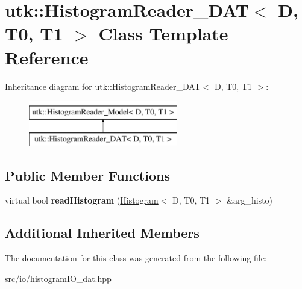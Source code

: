 \hypertarget{classutk_1_1HistogramReader__DAT}{\section{utk\-:\-:Histogram\-Reader\-\_\-\-D\-A\-T$<$ D, T0, T1 $>$ Class Template Reference}
\label{classutk_1_1HistogramReader__DAT}
}
Inheritance diagram for utk\-:\-:Histogram\-Reader\-\_\-\-D\-A\-T$<$ D, T0, T1 $>$\-:\begin{figure}[H]
\begin{center}
\leavevmode
\includegraphics[height=2.000000cm]{classutk_1_1HistogramReader__DAT}
\end{center}
\end{figure}
\subsection*{Public Member Functions}
\begin{DoxyCompactItemize}
\item 
\hypertarget{classutk_1_1HistogramReader__DAT_a7a50f6829898ae205b42f386e8a6b520}{virtual bool {\bfseries read\-Histogram} (\hyperlink{classutk_1_1Histogram}{Histogram}$<$ D, T0, T1 $>$ \&arg\-\_\-histo)}\label{classutk_1_1HistogramReader__DAT_a7a50f6829898ae205b42f386e8a6b520}

\end{DoxyCompactItemize}
\subsection*{Additional Inherited Members}


The documentation for this class was generated from the following file\-:\begin{DoxyCompactItemize}
\item 
src/io/histogram\-I\-O\-\_\-dat.\-hpp\end{DoxyCompactItemize}
